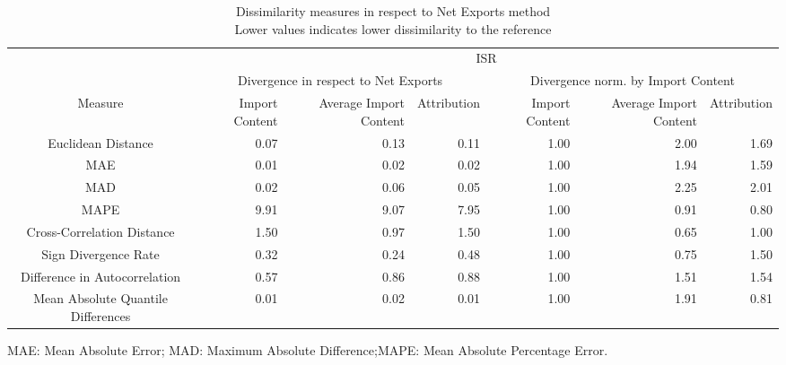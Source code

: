 \begin{table}[t]
\caption*{
{\large Dissimilarity measures in respect to Net Exports method} \\ 
{\small Lower values indicates lower dissimilarity to the reference}
} 
\fontsize{15.0pt}{18.0pt}\selectfont
\begin{tabular*}{\linewidth}{@{\extracolsep{\fill}}crrrrrr}
\toprule
 & \multicolumn{6}{c}{ISR} \\ 
\cmidrule(lr){2-7}
 & \multicolumn{3}{c}{Divergence in respect to Net Exports} & \multicolumn{3}{c}{Divergence norm. by Import Content} \\ 
\cmidrule(lr){2-4} \cmidrule(lr){5-7}
Measure & Import Content & Average Import Content & Attribution & Import Content & Average Import Content & Attribution \\ 
\midrule\addlinespace[2.5pt]
Euclidean Distance & 0.07 & 0.13 & 0.11 & 1.00 & 2.00 & 1.69 \\ 
MAE & 0.01 & 0.02 & 0.02 & 1.00 & 1.94 & 1.59 \\ 
MAD & 0.02 & 0.06 & 0.05 & 1.00 & 2.25 & 2.01 \\ 
MAPE & 9.91 & 9.07 & 7.95 & 1.00 & 0.91 & 0.80 \\ 
Cross-Correlation Distance & 1.50 & 0.97 & 1.50 & 1.00 & 0.65 & 1.00 \\ 
Sign Divergence Rate & 0.32 & 0.24 & 0.48 & 1.00 & 0.75 & 1.50 \\ 
Difference in Autocorrelation & 0.57 & 0.86 & 0.88 & 1.00 & 1.51 & 1.54 \\ 
Mean Absolute Quantile Differences & 0.01 & 0.02 & 0.01 & 1.00 & 1.91 & 0.81 \\ 
\bottomrule
\end{tabular*}
\begin{minipage}{\linewidth}
MAE: Mean Absolute Error; MAD: Maximum Absolute Difference;MAPE: Mean Absolute Percentage Error.\\
\end{minipage}
\end{table}

